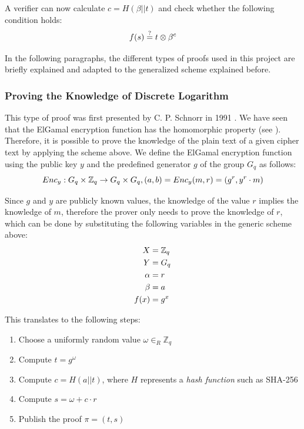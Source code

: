 \documentclass[numbers=noenddot, abstract=on, a4paper, headsepline,
footsepline, oneside, openright, draft=off, listof=leveldown]{scrreprt}
\newcommand{\myref}[1]{(see \Vref{#1})}
\begin{document}
A verifier can now calculate $c=H(\beta||t)$ and check whether the following
condition holds:
\begin{equation}
	f(s) \stackrel{?}{=} t \otimes \beta^c \notag
\end{equation}

 In the following paragraphs, the different types of proofs used in this
 project are briefly explained and adapted to the generalized scheme explained
 before.
 
\subsubsection{Proving the Knowledge of Discrete Logarithm}
\label{sec:proofknowledgedlog}
This type of proof was first presented by C. P. Schnorr in 1991
\cite{Schnorr91}. We have seen that the ElGamal encryption function has the
homomorphic property \myref{sec:homenc}. Therefore, it is possible to prove the
knowledge of the plain text of a given cipher text by applying the scheme above.
We define the ElGamal encryption function using the public key $y$ and the
predefined generator $g$ of the group $G_q$ as follows:
\begin{equation}
	Enc_y:G_q \times \mathbb{Z}_q \rightarrow G_q \times G_q, (a,b) = Enc_y(m,
	r)=(g^r, y^r \cdot m) \notag
\end{equation} 

Since $g$ and $y$ are publicly known values, the knowledge of the value $r$
implies the knowledge of $m$, therefore the prover only needs to prove the
knowledge of $r$, which can be done by substituting the following variables in
the generic scheme above:
\begin{align}
  X &= \mathbb{Z}_q \notag \\
  Y &= G_q \notag \\
  \alpha &=r \notag \\
  \beta &=a \notag \\
  f(x) &= g^x \notag
\end{align} 


This translates to the following steps:

\begin{enumerate}
  \item Choose a uniformly random value $\omega \in_R \mathbb{Z}_q$
  \item Compute $t=g^\omega$
  \item Compute $c=H(a||t)$, where $H$ represents a \emph{hash function} such
  as SHA-256
  \item Compute $s=\omega + c \cdot r$
  \item Publish the proof $\pi = (t,s)$
\end{enumerate}
\end{document}
